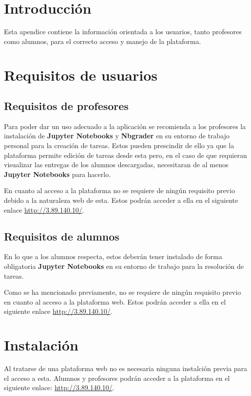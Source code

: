 
\section{Introducción}
Esta apendice contiene la información orientada a los usuarios, tanto profesores como alumnos, para el correcto acceso y manejo de la plataforma.

\section{Requisitos de usuarios}

\subsection{Requisitos de profesores}
Para poder dar un uso adecuado a la aplicación se recomienda a los profesores la instalación de \textbf{Jupyter Notebooks} y \textbf{Nbgrader} en su entorno de trabajo personal para la creación de tareas. Estos pueden prescindir de ello ya que la plataforma permite edición de tareas desde esta pero, en el caso de que requieran visualizar las entregas de los alumnos descargadas, necesitaran de al menos \textbf{Jupyter Notebooks} para hacerlo.

En cuanto al acceso a la plataforma no se requiere de ningún requisito previo debido a la naturaleza web de esta. Estos podrán acceder a ella en el siguiente enlace \url{http://3.89.140.10/}.

\subsection{Requisitos de alumnos}
En lo que a los alumnos respecta, estos deberán tener instalado de forma obligatoria \textbf{Jupyter Notebooks} en su entorno de trabajo para la resolución de tareas.

Como se ha mencionado previamente, no se requiere de ningún requisito previo en cuanto al acceso a la plataforma web. Estos podrán acceder a ella en el siguiente enlace \url{http://3.89.140.10/}.

\section{Instalación}
Al tratarse de una plataforma web no es necesaria ninguna instalción previa para el acceso a esta. Alumnos y profesores podrán acceder a la plataforma en el siguiente enlace: \url{http://3.89.140.10/}.




